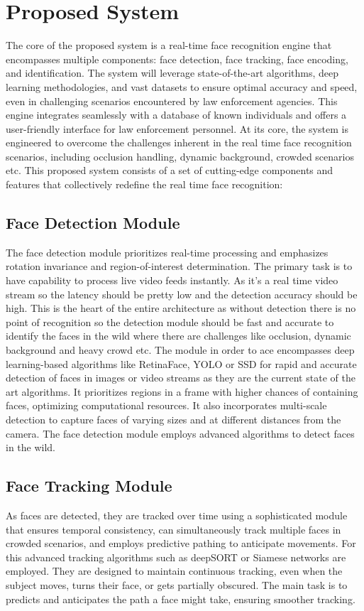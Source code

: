 \section{Proposed System}
The core of the proposed system is a real-time face recognition engine that encompasses multiple components: face detection, face tracking, face encoding, and identification. The system will leverage state-of-the-art algorithms, deep learning methodologies, and vast datasets to ensure optimal accuracy and speed, even in challenging scenarios encountered by law enforcement agencies. This engine integrates seamlessly with a database of known individuals and offers a user-friendly interface for law enforcement personnel. At its core, the system is engineered to overcome the challenges inherent in the real time face recognition scenarios, including occlusion handling, dynamic background, crowded scenarios etc. This proposed system consists of a set of cutting-edge components and features that collectively redefine the real time face recognition:

	\subsection{Face Detection Module}
		The face detection module prioritizes real-time processing and emphasizes rotation invariance and region-of-interest determination. The primary task is to have capability to process live video feeds instantly. As it's a real time video stream so the latency should be pretty low and the detection accuracy should be high. This is the heart of the entire architecture as without detection there is no point of recognition so the detection module should be fast and accurate to identify the faces in the wild where there are challenges like occlusion, dynamic background and heavy crowd etc. The module in order to ace encompasses deep learning-based algorithms like RetinaFace, YOLO or SSD for rapid and accurate detection of faces in images or video streams as they are the current state of the art algorithms. It prioritizes regions in a frame with higher chances of containing faces, optimizing computational resources. It also incorporates multi-scale detection to capture faces of varying sizes and at different distances from the camera.
		The face detection module employs advanced algorithms to detect faces in the wild.
		

	\subsection{Face Tracking Module}
		As faces are detected, they are tracked over time using a sophisticated module that ensures temporal consistency, can simultaneously track multiple faces in crowded scenarios, and employs predictive pathing to anticipate movements. For this advanced tracking algorithms such as deepSORT or Siamese networks are employed. They are designed to maintain continuous tracking, even when the subject moves, turns their face, or gets partially obscured. The main task is to predicts and anticipates the path a face might take, ensuring smoother tracking.

